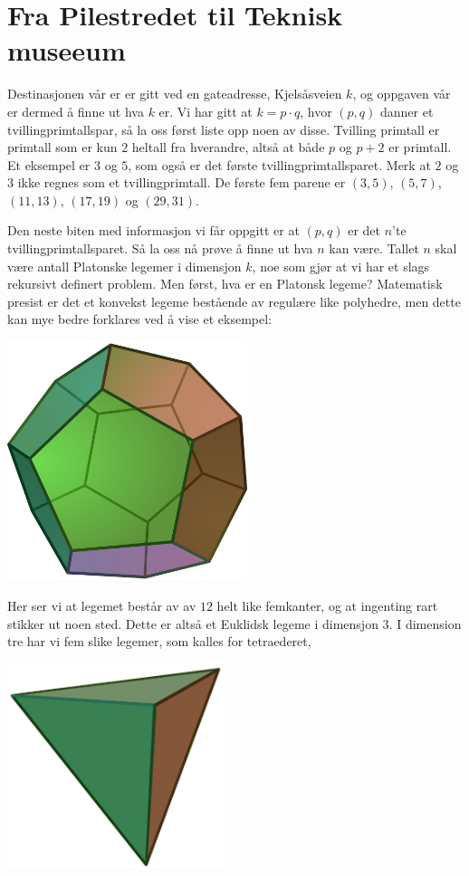 \section*{Fra Pilestredet til Teknisk museeum}

Destinasjonen vår er er gitt ved en gateadresse, Kjelsåsveien $k$, og oppgaven vår er dermed å finne ut hva $k$ er. Vi har gitt at $k=p\cdot q$, hvor $(p,q)$  danner et tvillingprimtallspar, så la oss først liste opp noen av disse. Tvilling primtall er primtall som er kun $2$ heltall fra hverandre, altså at både $p$ og $p+2$ er primtall. Et eksempel er $3$ og $5$, som også er det første tvillingprimtallsparet. Merk at $2$ og $3$ ikke regnes som et tvillingprimtall. De første fem parene er $(3,5)$, $(5,7)$, $(11,13)$, $(17,19)$ og $(29,31)$. 

Den neste biten med informasjon vi får oppgitt er at $(p,q)$ er det $n$’te tvillingprimtallsparet. Så la oss nå prøve å finne ut hva $n$ kan være. Tallet $n$ skal være antall Platonske legemer i dimensjon $k$, noe som gjør at vi har et slags rekursivt definert problem. Men først, hva er en Platonsk legeme? Matematisk presist er det et konvekst legeme bestående av regulære like polyhedre, men dette kan mye bedre forklares ved å vise et eksempel: 

\begin{center}
    \includegraphics[height = 7cm]{img/Dodecahedron.png}    
\end{center}

Her ser vi at legemet består av av $12$ helt like femkanter, og at ingenting rart stikker ut noen sted. Dette er altså et Euklidsk legeme i dimensjon $3$. I dimension tre har vi fem slike legemer, som kalles for tetraederet,

\begin{center}
\includegraphics[height = 6cm]{img/Tetrahedron.png}
\end{center}

